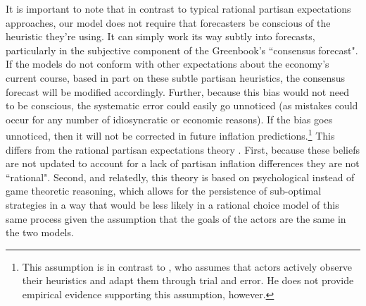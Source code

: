 \documentclass[a4paper]{article}\usepackage[]{graphicx}\usepackage[]{color}
\begin{document}
It is important to note that in contrast to typical rational partisan expectations approaches, our model does not require that forecasters be conscious of the heuristic they're using. It can simply work its way subtly into forecasts, particularly in the subjective component of the Greenbook's ``consensus forecast". If the models do not conform with other expectations about the economy's current course, based in part on these subtle partisan heuristics, the consensus forecast will be modified accordingly. Further, because this bias would not need to be conscious, the systematic error could easily go unnoticed (as mistakes could occur for any number of idiosyncratic or economic reasons). If the bias goes unnoticed, then it will not be corrected in future inflation predictions.\footnote{This assumption is in contrast to \cite{Grauwe2011}, who assumes that actors actively observe their heuristics and adapt them through trial and error. He does not provide empirical evidence supporting this assumption, however.} This differs from the rational partisan expectations theory \cite[e.g.][]{Alesina1987,Alesina1991,Alesina1997,Hibbs1994}. First, because these beliefs are not updated to account for a lack of partisan inflation differences they are not ``rational". Second, and relatedly, this theory is based on psychological instead of game theoretic reasoning, which allows for the persistence of sub-optimal strategies in a way that would be less likely in a rational choice model of this same process given the assumption that the goals of the actors are the same in the two models.





\end{document}
